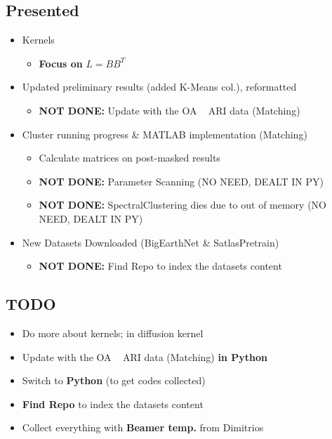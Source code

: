 
\begin{multicols}{2}

\subsection*{Presented}
\begin{itemize}
    \item Kernels
    \begin{itemize}
        \item \textbf{Focus on } \( L = BB^T \)
    \end{itemize}
    \item Updated preliminary results (added K-Means col.), reformatted
    \begin{itemize}
        \item \textbf{NOT DONE:} Update with the OA ~ ARI data (Matching)
    \end{itemize}
    \item Cluster running progress \& MATLAB implementation (Matching)
    \begin{itemize}
        \item Calculate matrices on post-masked results
        \item \textbf{NOT DONE:} Parameter Scanning (NO NEED, DEALT IN PY)
        \item \textbf{NOT DONE:} SpectralClustering dies due to out of memory (NO NEED, DEALT IN PY)
    \end{itemize}
    \item New Datasets Downloaded (BigEarthNet \& SatlasPretrain)
    \begin{itemize}
        \item \textbf{NOT DONE:} Find Repo to index the datasets content
    \end{itemize}
\end{itemize}

\columnbreak %

\subsection*{TODO}
\begin{itemize}
    \item Do more about kernels; in diffusion kernel
    \item Update with the OA ~ ARI data (Matching) \textbf{in Python}
    \item Switch to \textbf{Python} (to get codes collected)
    \item \textbf{Find Repo} to index the datasets content
    \item Collect everything with \textbf{Beamer temp.} from Dimitrios
\end{itemize}


\end{multicols}
